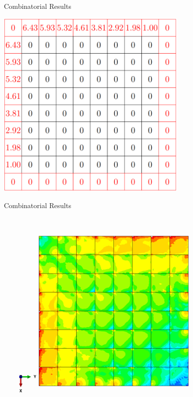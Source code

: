 \documentclass{beamer}
\numberwithin{equation}{aufgabe}
\begin{document}
\begin{frame}{Combinatorial Results}
    \begin{center}
        \includegraphics[width=0.7\textwidth]{images/p1-result.png}
    \end{center}
\end{frame}

\begin{frame}{Combinatorial Results}
    \begin{center}
        \includegraphics[width=0.85\textwidth]{images/stress-p1-presentation-top.png}
    \end{center}
\end{frame}
\end{document}
